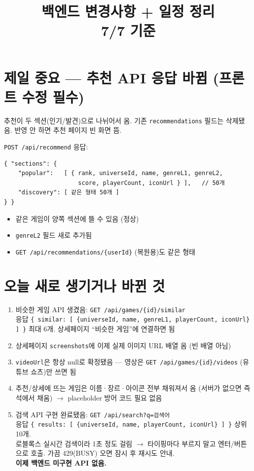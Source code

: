 \documentclass[11pt]{article}
\title{\textbf{백엔드 변경사항 + 일정 정리} \\ \large 7/7 기준}
\author{}
\date{}
\begin{document}
\maketitle
\vspace{-3em}

\section*{\textcolor{warn}{제일 중요 --- 추천 API 응답 바뀜 (프론트 수정 필수)}}

추천이 두 섹션(인기/발견)으로 나뉘어서 옴. 기존 \texttt{recommendations} 필드는
삭제됐음. 반영 안 하면 추천 페이지 빈 화면 뜸.

\begin{jsonbox}
\texttt{POST /api/recommend} 응답:
\begin{verbatim}
{ "sections": {
    "popular":   [ { rank, universeId, name, genreL1, genreL2,
                     score, playerCount, iconUrl } ],   // 50개
    "discovery": [ 같은 형태 50개 ]
} }
\end{verbatim}
\end{jsonbox}

\begin{itemize}
  \item 같은 게임이 양쪽 섹션에 뜰 수 있음 (정상)
  \item \texttt{genreL2} 필드 새로 추가됨
  \item \texttt{GET /api/recommendations/\{userId\}} (복원용)도 같은 형태
\end{itemize}

\section*{오늘 새로 생기거나 바뀐 것}

\begin{enumerate}
  \item 비슷한 게임 API 생겼음: \texttt{GET /api/games/\{id\}/similar} \\
        응답 \texttt{\{ similar: [ \{universeId, name, genreL1, playerCount, iconUrl\} ] \}}
        최대 6개. 상세페이지 ``비슷한 게임''에 연결하면 됨
  \item 상세페이지 \texttt{screenshots}에 이제 실제 이미지 URL 배열 옴 (빈 배열 아님)
  \item \texttt{videoUrl}은 항상 null로 확정됐음 --- 영상은
        \texttt{GET /api/games/\{id\}/videos} (유튜브 쇼츠)만 쓰면 됨
  \item 추천/상세에 뜨는 게임은 이름·장르·아이콘 전부 채워져서 옴
        (서버가 없으면 즉석에서 채움) $\to$ placeholder 방어 코드 필요 없음
  \item 검색 API 구현 완료됐음: \texttt{GET /api/search?q=검색어} \\
        응답 \texttt{\{ results: [ \{universeId, name, playerCount, iconUrl\} ] \}} 상위 10개. \\
        로블록스 실시간 검색이라 1초 정도 걸림 $\to$ 타이핑마다 부르지 말고
        엔터/버튼으로 호출. 가끔 429(BUSY) 오면 잠시 후 재시도 안내. \\
        \textbf{이제 백엔드 미구현 API 없음.}
\end{enumerate}
\end{document}
